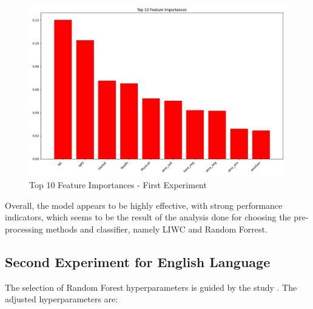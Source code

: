 \begin{figure}[htbp]
	\centering
		\includegraphics[scale=0.5]{LaTeX Bachelor Thesis Depression Signs Detection/figures/metrics/experiment1English/top10features.jpg}
	\caption{Top 10 Feature Importances -  First Experiment}
	\label{top10FeaturesFirstExperiment}
\end{figure}

Overall, the model appears to be highly effective, with strong performance indicators, which seems to be the result of the analysis done for choosing the pre-processing methods and classifier, namely LIWC \cite{boyd2022development} and Random Forrest.

\subsection{Second Experiment for English Language}
The selection of Random Forest hyperparameters is guided by the study \cite{probst2019hyperparameters}. The adjusted hyperparameters are:

